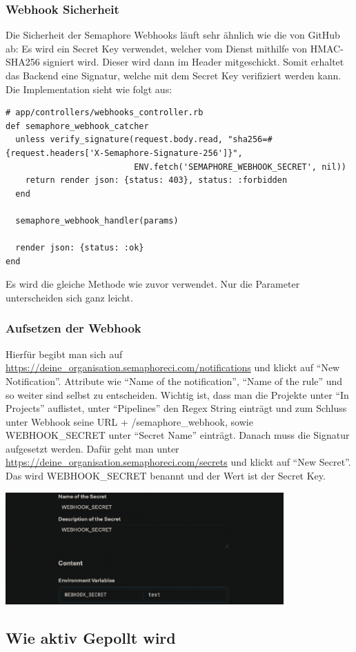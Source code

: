\subsubsection{Webhook Sicherheit}
Die Sicherheit der Semaphore Webhooks läuft sehr ähnlich wie die von GitHub ab: Es wird ein Secret Key verwendet,
welcher vom Dienst mithilfe von HMAC-SHA256 signiert wird. Dieser wird dann im Header mitgeschickt. Somit erhaltet
das Backend eine Signatur, welche mit dem Secret Key verifiziert werden kann. \newline
Die Implementation sieht wie folgt aus:
\begin{codebox}[]
  \begin{verbatim}
# app/controllers/webhooks_controller.rb
def semaphore_webhook_catcher
  unless verify_signature(request.body.read, "sha256=#{request.headers['X-Semaphore-Signature-256']}",
                          ENV.fetch('SEMAPHORE_WEBHOOK_SECRET', nil))
    return render json: {status: 403}, status: :forbidden
  end

  semaphore_webhook_handler(params)

  render json: {status: :ok}
end
  \end{verbatim}
\end{codebox}
Es wird die gleiche  Methode wie zuvor verwendet. Nur die Parameter
unterscheiden sich ganz leicht.

\subsubsection{Aufsetzen der Webhook}
Hierfür begibt man sich auf \url{https://deine_organisation.semaphoreci.com/notifications} und klickt auf 
\enquote{New Notification}. Attribute wie \enquote{Name of the notification}, \enquote{Name of the rule} und so weiter
sind selbst zu entscheiden. Wichtig ist, dass man die Projekte unter \enquote{In Projects} auflistet, unter 
\enquote{Pipelines} den Regex String  einträgt und zum Schluss unter Webhook
seine URL + /semaphore\_webhook, sowie WEBHOOK\_SECRET unter \enquote{Secret Name} einträgt. \newline
Danach muss die Signatur aufgesetzt werden. Dafür geht man unter
\url{https://deine_organisation.semaphoreci.com/secrets} und klickt auf \enquote{New Secret}. Das wird WEBHOOK\_SECRET
benannt und der Wert ist der Secret Key.
\begin{center}
  \includegraphics[width=0.8\textwidth]{images/misc/setup_semaphore_webhook.png}
  \label{fig:setup_semaphore_webhook}
\end{center}

\subsection{Wie aktiv Gepollt wird}
\label{sec:why_active_polling}

